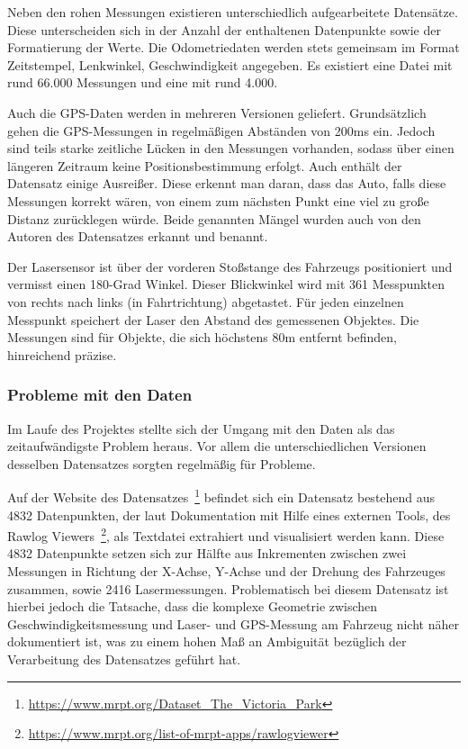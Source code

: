 \documentclass[11pt]{article}
\begin{document}
Neben den rohen Messungen existieren unterschiedlich aufgearbeitete Datensätze. Diese unterscheiden sich in der Anzahl der enthaltenen Datenpunkte sowie der Formatierung der Werte. Die Odometriedaten werden stets gemeinsam im Format {Zeitstempel, Lenkwinkel, Geschwindigkeit} angegeben. Es existiert eine Datei mit rund 66.000 Messungen und eine mit rund 4.000.

Auch die GPS-Daten werden in mehreren Versionen geliefert. 
Grund\-sätz\-lich gehen die GPS-Messungen in regelmäßigen Abständen von 200ms ein. Jedoch sind teils starke zeitliche Lücken in den Messungen vorhanden, sodass über einen längeren Zeitraum keine Positionsbestimmung erfolgt. Auch enthält der Datensatz einige Ausreißer. Diese erkennt man daran, dass das Auto, falls diese Messungen korrekt wären, von einem zum nächsten Punkt eine viel zu große Distanz zurücklegen würde. Beide genannten Mängel wurden auch von den Autoren des Datensatzes erkannt und benannt.

Der Lasersensor ist über der vorderen Stoßstange des Fahrzeugs positioniert und vermisst einen 180-Grad Winkel. Dieser Blickwinkel wird mit 361 Messpunkten von rechts nach links (in Fahrtrichtung) abgetastet. Für jeden einzelnen Messpunkt speichert der Laser den Abstand des gemessenen Objektes. Die Messungen sind für Objekte, die sich höchstens 80m entfernt befinden, hinreichend präzise. 

\subsubsection{Probleme mit den Daten}
Im Laufe des Projektes stellte sich der Umgang mit den Daten als das zeitaufwändigste Problem heraus. Vor allem die unterschiedlichen Versionen desselben Datensatzes sorgten regelmäßig für Probleme.

Auf der Website des Datensatzes~\footnote{\url{https://www.mrpt.org/Dataset_The_Victoria_Park}} befindet sich ein Datensatz bestehend aus 4832 Datenpunkten, der laut Dokumentation mit Hilfe eines externen Tools, des Rawlog Viewers~\footnote{\url{https://www.mrpt.org/list-of-mrpt-apps/rawlogviewer}}, als Textdatei extrahiert und visualisiert werden kann. Diese 4832 Datenpunkte setzen sich zur Hälfte aus Inkrementen zwischen zwei Messungen in Richtung der X-Achse, Y-Achse und der Drehung des Fahrzeuges zusammen, sowie 2416 Lasermessungen. Problematisch bei diesem Datensatz ist hierbei jedoch die Tatsache, dass die komplexe Geometrie zwischen Geschwindigkeitsmessung und Laser- und GPS-Messung am Fahrzeug nicht näher dokumentiert ist, was zu einem hohen Maß an Ambiguität bezüglich der Verarbeitung des Datensatzes geführt hat. 
\end{document}
